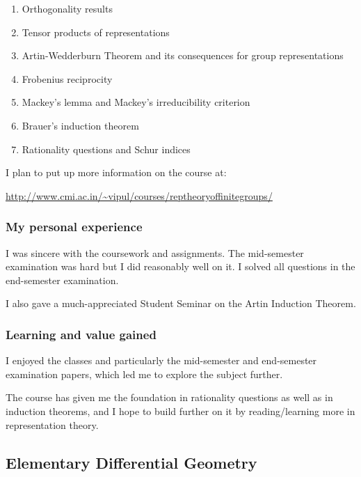 \documentclass[a4paper]{amsart}
\begin{document}
\begin{enumerate}

\item Orthogonality results

\item Tensor products of representations

\item Artin-Wedderburn Theorem and its consequences for group representations

\item Frobenius reciprocity

\item Mackey's lemma and Mackey's irreducibility criterion

\item Brauer's induction theorem

\item Rationality questions and Schur indices

\end{enumerate}

I plan to put up more information on the course at:

\url{http://www.cmi.ac.in/~vipul/courses/reptheoryoffinitegroups/}
\subsubsection{My personal experience}

I was sincere with the coursework and assignments. The mid-semester
examination was hard but I did reasonably well on it. I solved all
questions in the end-semester examination.

I also gave a much-appreciated Student Seminar on the Artin Induction Theorem.

\subsubsection{Learning and value gained}

I enjoyed the classes and particularly the mid-semester and end-semester
examination papers, which led me to explore the subject further.

The course has given me the foundation in rationality questions
as well as in induction theorems, and I hope to build further on it
by reading/learning more in representation theory.

\subsection{Elementary Differential Geometry}
\end{document}

